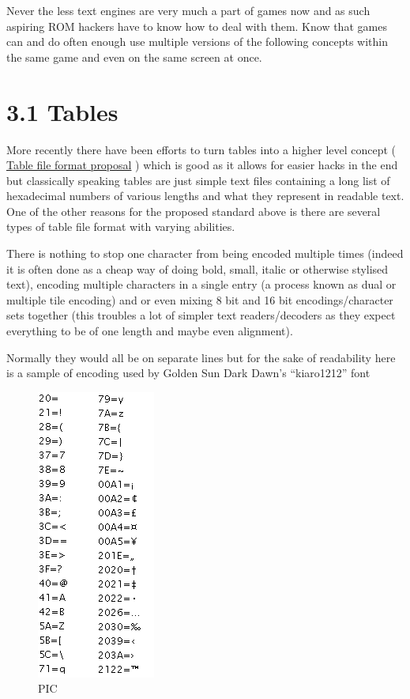 \documentclass[
]{book}
\begin{document}
Never the less text engines are very much a part of games now and as such aspiring ROM hackers have to know how to deal with them. Know that games can and do often enough use multiple versions of the following concepts within the same game and even on the same screen at once.

\hypertarget{tables}{%
\section{3.1 Tables}\label{tables}}

More recently there have been efforts to turn tables into a higher level concept ( \href{http://transcorp.parodius.com/scratchpad/Table\%20File\%20Format.txt}{Table file format proposal} ) which is good as it allows for easier hacks in the end but classically speaking tables are just simple text files containing a long list of hexadecimal numbers of various lengths and what they represent in readable text. One of the other reasons for the proposed standard above is there are several types of table file format with varying abilities.

There is nothing to stop one character from being encoded multiple times (indeed it is often done as a cheap way of doing bold, small, italic or otherwise stylised text), encoding multiple characters in a single entry (a process known as dual or multiple tile encoding) and or even mixing 8 bit and 16 bit encodings/character sets together (this troubles a lot of simpler text readers/decoders as they expect everything to be of one length and maybe even alignment).

Normally they would all be on separate lines but for the sake of readability here is a sample of encoding used by Golden Sun Dark Dawn's ``kiaro1212'' font

\begin{figure}
\centering
\includegraphics{images/79_home_fast6191_romhackingguide_unrenamed_files_and_original_borders_romhackingencodingdemo.png}
\caption{PIC}
\end{figure}
\end{document}
